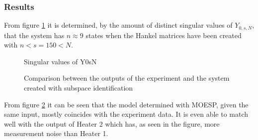 \subsubsection{Results}
From figure \ref{fig:SingularY0sN} it is determined, by the amount of distinct singular values of $Y_{0,s,N}$, that the system has $n \approx 9$ states when the Hankel matrices have been created with $n < s = 150 < N$.
\begin{figure}[ht]
    \centering
    
    \caption{Singular values of Y0sN}
    \label{fig:SingularY0sN}
\end{figure}
\begin{figure}[ht]
    \centering
    
    \caption{Comparison between the outputs of the experiment and the system created with subspace identification}
    \label{fig:Comp_subID}
\end{figure}
From figure \ref{fig:Comp_subID} it can be seen that the model determined with MOESP, given the same input, mostly coincides with the experiment data. It is even able to match well with the output of Heater 2 which has, as seen in the figure, more measurement noise than Heater 1.

